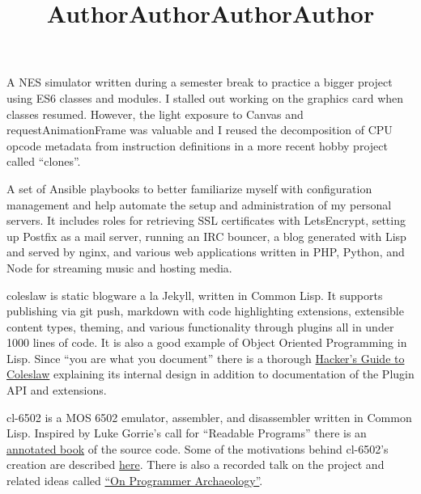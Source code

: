 \documentclass[margintitle,line]{res}
\begin{document}
\begin{resume}
\title{Author}
\begin{position}
  A NES simulator written during a semester break to practice a bigger project
  using ES6 classes and modules. I stalled out working on the graphics card
  when classes resumed. However, the light exposure to Canvas and requestAnimationFrame
  was valuable and I reused the decomposition of CPU opcode metadata from instruction
  definitions in a more recent hobby project called ``clones''.
\end{position}

\title{Author}
\begin{position}
  A set of Ansible playbooks to better familiarize myself with configuration management
  and help automate the setup and administration of my personal servers. It includes roles
  for retrieving SSL certificates with LetsEncrypt, setting up Postfix as a mail server,
  running an IRC bouncer, a blog generated with Lisp and served by nginx, and various
  web applications written in PHP, Python, and Node for streaming music and hosting media.
\end{position}

\title{Author}
\begin{position}
  coleslaw is static blogware a la Jekyll, written in Common Lisp. It
  supports publishing via git push, markdown with code highlighting extensions,
  extensible content types, theming, and various functionality through plugins
  all in under 1000 lines of code. It is also a good example of Object Oriented
  Programming in Lisp. Since ``you are what you document'' there is a thorough
  \href{https://github.com/kingcons/coleslaw/blob/master/docs/hacking.md}{Hacker's Guide to Coleslaw}
  explaining its internal design in addition to documentation of the Plugin API
  and extensions.
\end{position}

\title{Author}
\begin{position}
  cl-6502 is a MOS 6502 emulator, assembler, and disassembler written in
  Common Lisp. Inspired by Luke Gorrie's call for ``Readable Programs'' there
  is an \href{http://redlinernotes.com/docs/cl-6502.pdf}{annotated book} of the
  source code.  Some of the motivations behind cl-6502's creation are described
  \href{https://blog.kingcons.io/posts/Towards-Comprehensible-Computing.html}{here}.
  There is also a recorded talk on the project and related ideas called
  \href{https://vimeo.com/redline6561/on-programmer-archaeology}{``On Programmer Archaeology''}.
\end{position}


\end{resume}
\end{document}
